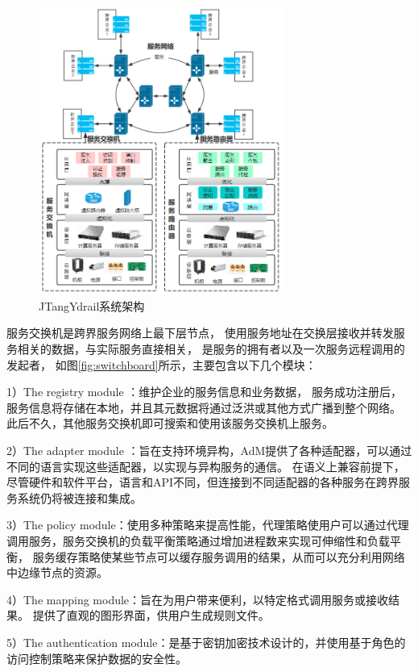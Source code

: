   \begin{figure}[htbp]
    \centering
    \includegraphics[width=8cm]{./images/system.png}
    \caption{JTangYdrail系统架构}
    \label{fig:system}
  \end{figure}

  服务交换机是跨界服务网络上最下层节点，
  使用服务地址在交换层接收并转发服务相关的数据，与实际服务直接相关，
  是服务的拥有者以及一次服务远程调用的发起者，
如图\ref{fig:switchboard}所示，主要包含以下几个模块：

1）The registry module ：维护企业的服务信息和业务数据，
服务成功注册后，服务信息将存储在本地，并且其元数据将通过泛洪或其他方式广播到整个网络。
此后不久，其他服务交换机即可搜索和使用该服务交换机上服务。

2）The adapter module ：旨在支持环境异构，AdM提供了各种适配器，可以通过不同的语言实现这些适配器，以实现与异构服务的通信。
在语义上兼容前提下，尽管硬件和软件平台，语言和API不同，但连接到不同适配器的各种服务在跨界服务系统仍将被连接和集成。

3）The policy module：使用多种策略来提高性能，代理策略使用户可以通过代理调用服务，服务交换机的负载平衡策略通过增加进程数来实现可伸缩性和负载平衡，
服务缓存策略使某些节点可以缓存服务调用的结果，从而可以充分利用网络中边缘节点的资源。 

4）The mapping module：旨在为用户带来便利，以特定格式调用服务或接收结果。
 提供了直观的图形界面，供用户生成规则文件。 
 
5）The authentication module：是基于密钥加密技术设计的，并使用基于角色的访问控制策略来保护数据的安全性。

